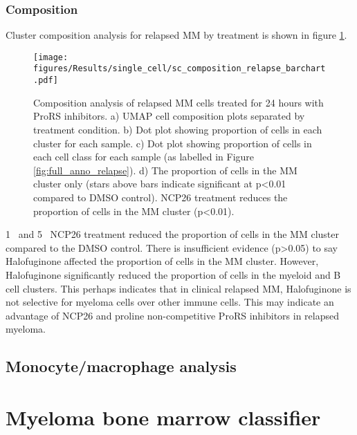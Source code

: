 \subsubsection{Composition}
Cluster composition analysis for relapsed MM by treatment is shown in figure \ref{fig:composition_relapse}.
\begin{figure}[htb]
\centering
\texttt{[image: figures/Results/single\_cell/sc\_composition\_relapse\_barchart.pdf]}
\caption[scRNA-seq composition analysis- relapsed MM]{Composition analysis of relapsed MM cells treated for 24 hours with ProRS inhibitors.
    a) UMAP cell composition plots separated by treatment condition.
    b) Dot plot showing proportion of cells in each cluster for each sample.
    c) Dot plot showing proportion of cells in each cell class for each sample (as labelled in Figure \ref{fig:full_anno_relapse}).
    d) The proportion of cells in the MM cluster only (stars above bars indicate significant at p<0.01 compared to DMSO control).
NCP26 treatment reduces the proportion of cells in the MM cluster (p<0.01).}
\label{fig:composition_relapse}
\end{figure}
1\si{\micro\Molar} and 5\si{\micro\Molar} NCP26 treatment reduced the proportion of cells in the MM cluster compared to the DMSO control.
There is insufficient evidence (p>0.05) to say Halofuginone affected the proportion of cells in the MM cluster.
However, Halofuginone significantly reduced the proportion of cells in the myeloid and B cell clusters.
This perhaps indicates that in clinical relapsed MM, Halofuginone is not selective for myeloma cells over other immune cells.
This may indicate an advantage of NCP26 and proline non-competitive ProRS inhibitors in relapsed myeloma. 


\subsection{Monocyte/macrophage analysis}

\clearpage
\section{Myeloma bone marrow classifier}